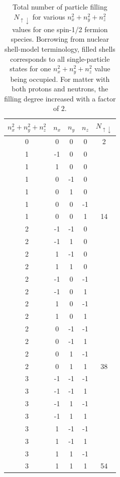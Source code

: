 \begin{table}
\begin{center}
\caption{Total number of particle filling $N_{\uparrow \downarrow }$
  for various $n_{x}^{2}+n_{y}^{2}+n_{z}^{2}$ values for one spin-1/2
  fermion species.  Borrowing from nuclear shell-model terminology,
  filled shells corresponds to all single-particle states for one
  $n_{x}^{2}+n_{y}^{2}+n_{z}^{2}$ value being occupied.  For matter
  with both protons and neutrons, the filling degree increased with a
  factor of $2$.} \label{tab:table1}
\begin{tabular}{ccccc}
\hline \multicolumn{1}{c}{ $n_{x}^{2}+n_{y}^{2}+n_{z}^{2}$ } &
\multicolumn{1}{c}{ $n_{x}$ } & \multicolumn{1}{c}{ $n_{y}$ } &
\multicolumn{1}{c}{ $n_{z}$ } & \multicolumn{1}{c}{ $N_{\uparrow
    \downarrow }$ } \\ \hline 0 & 0 & 0 & 0 & 2 \\ \hline 1 & -1 & 0 &
0 & \\ 1 & 1 & 0 & 0 & \\ 1 & 0 & -1 & 0 & \\ 1 & 0 & 1 & 0 & \\ 1 & 0
& 0 & -1 & \\ 1 & 0 & 0 & 1 & 14 \\ \hline 2 & -1 & -1 & 0 & \\ 2 & -1
& 1 & 0 & \\ 2 & 1 & -1 & 0 & \\ 2 & 1 & 1 & 0 & \\ 2 & -1 & 0 & -1 &
\\ 2 & -1 & 0 & 1 & \\ 2 & 1 & 0 & -1 & \\ 2 & 1 & 0 & 1 & \\ 2 & 0 &
-1 & -1 & \\ 2 & 0 & -1 & 1 & \\ 2 & 0 & 1 & -1 & \\ 2 & 0 & 1 & 1 &
38 \\ \hline 3 & -1 & -1 & -1 & \\ 3 & -1 & -1 & 1 & \\ 3 & -1 & 1 &
-1 & \\ 3 & -1 & 1 & 1 & \\ 3 & 1 & -1 & -1 & \\ 3 & 1 & -1 & 1 & \\ 3
& 1 & 1 & -1 & \\ 3 & 1 & 1 & 1 & 54 \\ \hline
\end{tabular}
\end{center}
\end{table}


